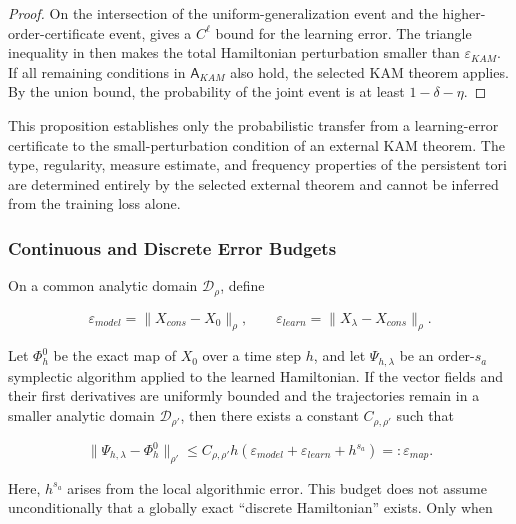 \begin{proof} On the intersection of the uniform-generalization event and the higher-order-certificate event,  gives a \(C^{\ell}\) bound for the learning error. The triangle inequality in  then makes the total Hamiltonian perturbation smaller than \(\varepsilon_{KAM}\). If all remaining conditions in \(\mathsf{A}_{KAM}\) also hold, the selected KAM theorem applies. By the union bound, the probability of the joint event is at least \(1-\delta-\eta\).\end{proof}

This proposition establishes only the probabilistic transfer from a learning-error certificate to the small-perturbation condition of an external KAM theorem. The type, regularity, measure estimate, and frequency properties of the persistent tori are determined entirely by the selected external theorem and cannot be inferred from the training loss alone.

\subsubsection{Continuous and Discrete Error Budgets}\label{sec:chnn-4-6-8}

On a common analytic domain \(\mathcal{D}_{\rho}\), define

\begin{equation}
\label{eq:chnn-4-59}
\varepsilon_{model} = \parallel X_{cons} - X_{0} \parallel_{\rho},\quad\quad\varepsilon_{learn} = \parallel X_{\lambda} - X_{cons} \parallel_{\rho}.
\end{equation}

Let \(\Phi_{h}^{0}\) be the exact map of \(X_{0}\) over a time step \(h\), and let \(\Psi_{h,\lambda}\) be an order-\(s_{a}\) symplectic algorithm applied to the learned Hamiltonian. If the vector fields and their first derivatives are uniformly bounded and the trajectories remain in a smaller analytic domain \(\mathcal{D}_{\rho\prime}\), then there exists a constant \(C_{\rho,\rho\prime}\) such that

\begin{equation}
\label{eq:chnn-4-60}
\boxed{\parallel \Psi_{h,\lambda} - \Phi_{h}^{0} \parallel_{\rho\prime} \leq C_{\rho,\rho\prime}h\left( \varepsilon_{model} + \varepsilon_{learn} + h^{s_{a}} \right) = :\varepsilon_{map}.}
\end{equation}

Here, \(h^{s_{a}}\) arises from the local algorithmic error. This budget does not assume unconditionally that a globally exact ``discrete Hamiltonian'' exists. Only when


